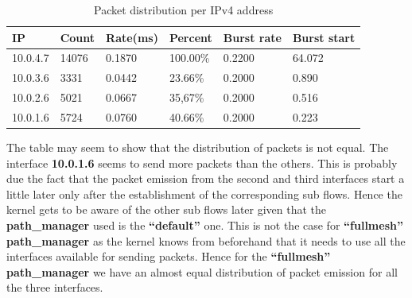 \documentclass[a4paper,11pt]{article}
\begin{document}
			\begin{table}[h]
				
				
				\centering
				\begin{tabular}{l|l|l|l|l|l}
					\hline
					IP & Count & Rate(ms) & Percent & Burst rate & Burst start \\
					\hline
					\hline
					10.0.4.7 & 14076 & 0.1870 & 100.00\% & 0.2200 & 64.072 \\
					\hline
					10.0.3.6 & 3331 & 0.0442 & 23.66\% & 0.2000 & 0.890 \\
					\hline
					10.0.2.6 & 5021 & 0.0667 & 35,67\% & 0.2000 & 0.516 \\
					\hline
					10.0.1.6 & 5724 & 0.0760 & 40.66\% & 0.2000 & 0.223 \\
					\hline
				\end{tabular}
				\caption{Packet distribution per IPv4 address}
			\end{table}

			The table may seem to show that the distribution of packets is not equal. The interface \textbf{10.0.1.6} seems to send more packets than the others. This is probably due the fact that the packet emission from the second and third interfaces start a little later only after the establishment of the corresponding sub flows. Hence the kernel gets to be aware of the other sub flows later given that the \textbf{path\_manager} used is the \textbf{``default''} one. This is not the case for \textbf{``fullmesh'' path\_manager} as the kernel knows from beforehand that it needs to use all the interfaces available for sending packets. Hence for the \textbf{``fullmesh'' path\_manager} we have an almost equal distribution of packet emission for all the three interfaces.
\end{document}
